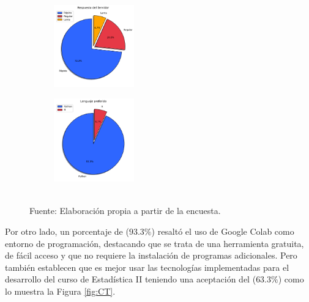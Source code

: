 \documentclass[letter,oneside,12pt,spanish]{report}
\begin{document}
\begin{figure}[h]
	\centering
    \begin{subfigure}
        \centering
        \includegraphics[width=0.38\textwidth]{Figs/Respuesta_Servidor.pdf}
    \end{subfigure}
	\hfill
    \begin{subfigure}
        \centering
        \includegraphics[width=0.38\textwidth]{Figs/lenguaje_preferido.pdf}
    \end{subfigure}
	\label{fig:RL}
	\\ Fuente: Elaboración propia a partir de la encuesta.
\end{figure}

Por otro lado, un porcentaje de ($93.3\%$) resaltó el uso de Google Colab como entorno de programación, destacando que se trata de una herramienta gratuita, de fácil acceso y que no requiere la instalación de programas adicionales.
Pero también establecen que es mejor usar las tecnologías implementadas para el desarrollo del curso de Estadística II teniendo una aceptación del ($63.3\%$) como lo muestra la Figura \ref{fig:CT}.
\end{document}
